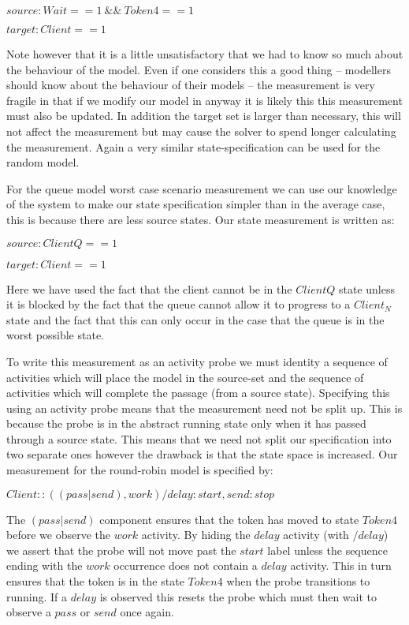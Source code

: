 \documentclass[times, 10pt,twocolumn]{article}
\newcommand{\showprobe}[1]{$#1$}
\newcommand{\showstatespec}[1]{$#1$}
\newcommand{\quoteActivity}[1]{$#1$}
\newcommand{\quoteProcess}[1]{$#1$}
\begin{document}
\showstatespec{source : Wait == 1\ \&\&\ Token4 == 1}

\showstatespec{target : Client == 1}

\noindent
Note however that it is a little unsatisfactory that we had to know
so much about the behaviour of the model. Even if one considers this
a good thing
-- modellers should know about the behaviour of their models --
the measurement is very fragile in that if we modify our model in
anyway it is likely this this measurement must also be updated.
In addition the target set is larger than necessary, this will not
affect the measurement but may cause the solver to spend longer
calculating the measurement. Again a very similar state-specification
can be used for the random model.

For the queue model worst case scenario measurement we can use our
knowledge of the system to make our state specification simpler
than in the average case, this is because there are less source
states. Our state measurement is written as:

\showstatespec{source : ClientQ == 1}

\showstatespec{target : Client == 1}

Here we have used the fact that the client cannot be in the 
\quoteProcess{ClientQ} state unless it is blocked by the fact that
the queue cannot allow it to progress to a \quoteProcess{Client_N} state
and the fact that this can only occur in the case that the queue is in
the worst possible state.

To write this measurement as an activity probe we must identity a
sequence of activities which will place the model in the source-set
and the sequence of activities which will complete the passage
(from a source state).
Specifying this using an activity probe means that the measurement need
not be split up. This is because the probe is in the abstract running state
only when it has passed through a source state. This means that we need not
split our specification into two separate ones however the drawback
is that the state space is increased.
Our measurement for the round-robin model is specified by:

\showprobe{Client:: ((pass|send), work)/delay : start, send:stop}

\noindent
The $(pass | send)$ component ensures that the token has moved to
state \quoteProcess{Token4} before we observe the \quoteActivity{work}
activity. By hiding the \quoteActivity{delay} activity
(with $/delay$) we assert that the probe will not move past the
\quoteActivity{start} label unless the sequence ending with the
\quoteActivity{work} occurrence does not contain a \quoteActivity{delay}
activity. This in turn ensures that the token is in the state
\quoteProcess{Token4} when the probe transitions to running.
If a \quoteActivity{delay} is observed this resets the probe which must
then wait to observe a \quoteActivity{pass} or \quoteActivity{send}
once again.
\end{document}
